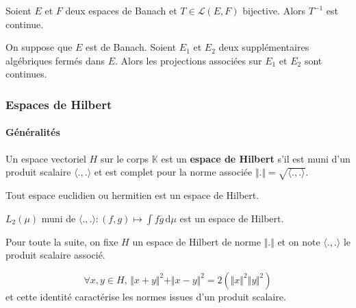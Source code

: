 	\begin{corollary}
		Soient $E$ et $F$ deux espaces de Banach et $T \in \mathcal{L}(E,F)$ bijective. Alors $T^{-1}$ est continue.
	\end{corollary}

	\begin{corollary}
		On suppose que $E$ est de Banach. Soient $E_1$ et $E_2$ deux supplémentaires algébriques fermés dans $E$. Alors les projections associées sur $E_1$ et $E_2$ sont continues.
	\end{corollary}

	\subsubsection{Espaces de Hilbert}

	\paragraph{Généralités}


	\begin{definition}
		Un espace vectoriel $H$ sur le corps $\mathbb{K}$ est un \textbf{espace de Hilbert} s'il est muni d'un produit scalaire $\langle . , . \rangle$ et est complet pour la norme associée $\Vert . \Vert = \sqrt{\langle . , . \rangle}$.
	\end{definition}

	\begin{example}
		Tout espace euclidien ou hermitien est un espace de Hilbert.
	\end{example}

	\begin{example}
		$L_2(\mu)$ muni de $\langle . , . \rangle : (f,g) \mapsto \int f \overline{g} \, \mathrm{d}\mu$ est un espace de Hilbert.
	\end{example}

	Pour toute la suite, on fixe $H$ un espace de Hilbert de norme $\Vert . \Vert$ et on note $\langle ., . \rangle$ le produit scalaire associé.

	\begin{lemma}
		\[ \forall x, y \in H, \, \Vert x + y \Vert^2 + \Vert x - y \Vert^2 = 2(\Vert x \Vert^2 \Vert y \Vert^2) \]
		et cette identité caractérise les normes issues d'un produit scalaire.
	\end{lemma}


